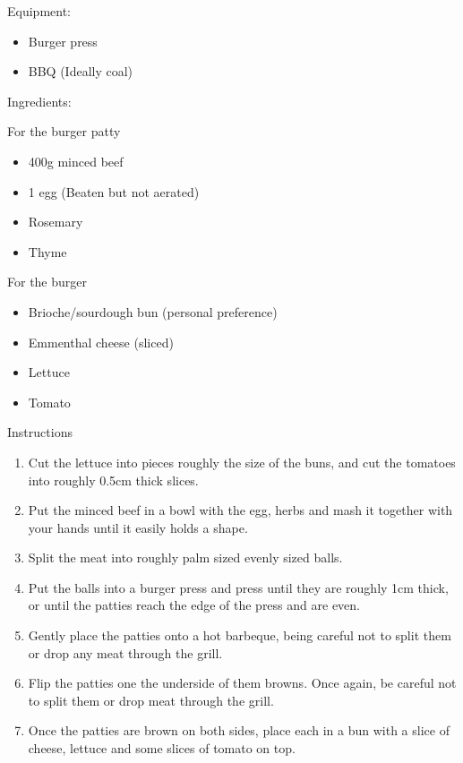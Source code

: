 \documentclass[a4paper, oneside]{book}
\begin{document}
\begin{multicols}{2}
        Equipment:

        {\begin{itemize}
            \item Burger press
            \item BBQ (Ideally coal)
        \end{itemize}}
        Ingredients:

        For the burger patty
        {\begin{itemize}
            \item 400g minced beef
            \item 1 egg (Beaten but not aerated)
            \item Rosemary
            \item Thyme
        \end{itemize}}
        For the burger
        {\begin{itemize}
            \item Brioche/sourdough bun (personal preference)
            \item Emmenthal cheese (sliced)
            \item Lettuce
            \item Tomato
        \end{itemize}}
    Instructions
    {\begin{enumerate}
        \item
            Cut the lettuce into pieces roughly the size of the buns, and cut
            the tomatoes into roughly 0.5cm thick slices.
        \item 
            Put the minced beef in a bowl with the egg, herbs and mash it
            together with your hands until it easily holds a shape.
        \item
            Split the meat into roughly palm sized evenly sized balls.
        \item
            Put the balls into a burger press and press until they are roughly
            1cm thick, or until the patties reach the edge of the press and are
            even.
        \item
            Gently place the patties onto a hot barbeque, being careful not to
            split them or drop any meat through the grill.
        \item
            Flip the patties one the underside of them browns. Once again, be
            careful not to split them or drop meat through the grill.
        \item 
            Once the patties are brown on both sides, place each in a bun with
            a slice of cheese, lettuce and some slices of tomato on top.
    \end{enumerate}}

\end{multicols}
\end{document}
